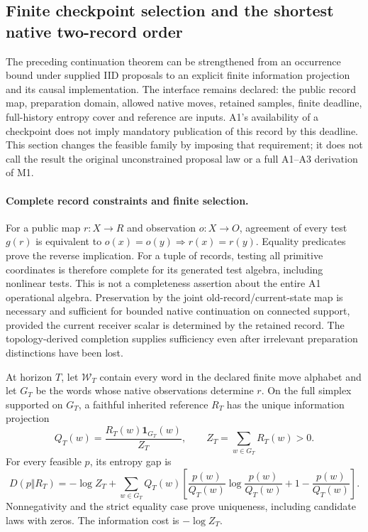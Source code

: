 \subsection{Finite checkpoint selection and the shortest native two-record order}
\label{sec:source-checkpoint-selection}

The preceding continuation theorem can be strengthened from an occurrence
bound under supplied IID proposals to an explicit finite information
projection and its causal implementation. The interface remains declared:
the public record map, preparation domain, allowed native moves, retained
samples, finite deadline, full-history entropy cover and reference are
inputs. A1's availability of a checkpoint does not imply mandatory
publication of this record by this deadline. This section changes the
feasible family by imposing that requirement; it does not call the result
the original unconstrained proposal law or a full A1--A3 derivation of M1.

\paragraph{Complete record constraints and finite selection.}
For a public map $r:X\to R$ and observation $o:X\to O$, agreement of
every test $g(r)$ is equivalent to
$o(x)=o(y)\Rightarrow r(x)=r(y)$. Equality predicates prove the
reverse implication. For a tuple of records, testing all primitive
coordinates is therefore complete for its generated test algebra, including
nonlinear tests. This is not a completeness assertion about the entire A1
operational algebra. Preservation by the joint old-record/current-state
map is necessary and sufficient for bounded native continuation on connected
support, provided the current receiver scalar is determined by the retained
record. The topology-derived completion supplies sufficiency even after
irrelevant preparation distinctions have been lost.

At horizon $T$, let $\mathcal W_T$ contain every word in the declared
finite move alphabet and let $G_T$ be the words whose native observations
determine $r$. On the full simplex supported on $G_T$, a faithful inherited
reference $R_T$ has the unique information projection
\[
 Q_T(w)=\frac{R_T(w)\mathbf 1_{G_T}(w)}{Z_T},
 \qquad Z_T=\sum_{w\in G_T}R_T(w)>0.
\]
For every feasible $p$, its entropy gap is
\[
 D(p\Vert R_T)=-\log Z_T+
 \sum_{w\in G_T}Q_T(w)
 \left[\frac{p(w)}{Q_T(w)}\log\frac{p(w)}{Q_T(w)}
       +1-\frac{p(w)}{Q_T(w)}\right].
\]
Nonnegativity and the strict equality case prove uniqueness, including
candidate laws with zeros. The information cost is $-\log Z_T$.

